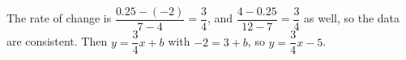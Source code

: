 The rate of change is $\dfrac{0.25-(-2)}{7-4}=\dfrac34$, and $\dfrac{4-0.25}{12-7}=\dfrac34$ as well, so the data are consistent. Then $y=\dfrac34x+b$ with $-2=3+b$, so $\boxed{y=\dfrac34x-5}$.
